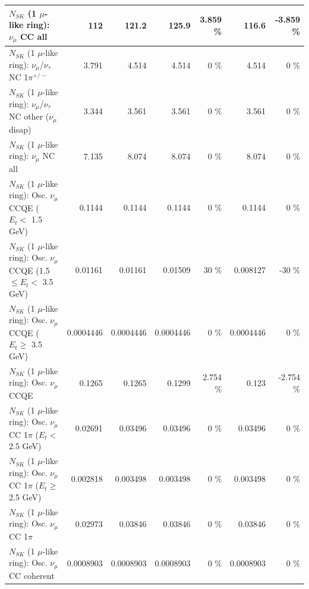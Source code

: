 \begin{table}
\begin{tabular}{| l | r | r | r  r | r  r |}
                                $N_{SK}$ (1 $\mu$-like ring): $\nu_{\mu}$ CC all &             112 &           121.2 &           125.9 &    3.859 \%  &           116.6 &   -3.859 \%  \\ 
\hline
              $N_{SK}$ (1 $\mu$-like ring): $\nu_\mu$/$\nu_\tau$ NC 1$\pi^{+/-}$ &           3.791 &           4.514 &           4.514 &        0 \%  &           4.514 &        0 \%  \\ 
   $N_{SK}$ (1 $\mu$-like ring): $\nu_\mu$/$\nu_\tau$ NC other ($\nu_\mu$ disap) &           3.344 &           3.561 &           3.561 &        0 \%  &           3.561 &        0 \%  \\ 
                                $N_{SK}$ (1 $\mu$-like ring): $\nu_{\mu}$ NC all &           7.135 &           8.074 &           8.074 &        0 \%  &           8.074 &        0 \%  \\ 
\hline
\hline
           $N_{SK}$ (1 $\mu$-like ring): Osc. $\nu_\mu$ CCQE ($E_{t} <$ 1.5 GeV) &          0.1144 &          0.1144 &          0.1144 &        0 \%  &          0.1144 &        0 \%  \\ 
  $N_{SK}$ (1 $\mu$-like ring): Osc. $\nu_\mu$ CCQE (1.5 $\leq E_{t} <$ 3.5 GeV) &         0.01161 &         0.01161 &         0.01509 &       30 \%  &        0.008127 &      -30 \%  \\ 
        $N_{SK}$ (1 $\mu$-like ring): Osc. $\nu_\mu$ CCQE ($E_{t} \geq$ 3.5 GeV) &       0.0004446 &       0.0004446 &       0.0004446 &        0 \%  &       0.0004446 &        0 \%  \\ 
\hline
                               $N_{SK}$ (1 $\mu$-like ring): Osc. $\nu_\mu$ CCQE &          0.1265 &          0.1265 &          0.1299 &    2.754 \%  &           0.123 &   -2.754 \%  \\ 
\hline
      $N_{SK}$ (1 $\mu$-like ring): Osc. $\nu_\mu$ CC 1$\pi$ ($E_{t} <$ 2.5 GeV) &         0.02691 &         0.03496 &         0.03496 &        0 \%  &         0.03496 &        0 \%  \\ 
   $N_{SK}$ (1 $\mu$-like ring): Osc. $\nu_\mu$ CC 1$\pi$ ($E_{t} \geq$ 2.5 GeV) &        0.002818 &        0.003498 &        0.003498 &        0 \%  &        0.003498 &        0 \%  \\ 
\hline
                          $N_{SK}$ (1 $\mu$-like ring): Osc. $\nu_\mu$ CC 1$\pi$ &         0.02973 &         0.03846 &         0.03846 &        0 \%  &         0.03846 &        0 \%  \\ 
                        $N_{SK}$ (1 $\mu$-like ring): Osc. $\nu_\mu$ CC coherent &       0.0008903 &       0.0008903 &       0.0008903 &        0 \%  &       0.0008903 &        0 \%  \\ 

\end{tabular}
\end{table}
